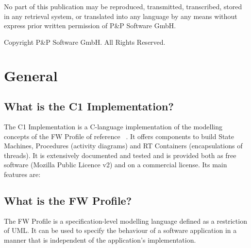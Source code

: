 \documentclass[a4paper,10pt]{article}
\let\stdsection\section
\renewcommand\section{\newpage\stdsection}
\begin{document}
\newpage
\vspace*{\fill}
\begin{center}
No part of this publication may be reproduced, transmitted, transcribed, stored in any retrieval system, or translated into any language
by any means without express prior written permission of P\&P Software GmbH.
\end{center}

\begin{center}
Copyright  P\&P Software GmbH. All Rights Reserved. 
\end{center}
\vspace*{\fill}

\newpage

\tableofcontents
\newpage

\setlength{\parskip}{3mm}						%


\section{General}
\subsection{What is the C1 Implementation?}
The C1 Implementation is a C-language implementation of the modelling concepts of the FW Profile of reference ~\cite{ref:fwprofile}. It offers components to build State Machines, Procedures (activity diagrams) and RT Containers (encapsulations of threads). It is extensively documented and tested and is provided both as free software (Mozilla Public Licence v2) and on a commercial license. Its main features are:



\subsection{What is the FW Profile?}\label{faq:FW_Profile}
The FW Profile is a specification-level modelling language defined as a restriction of UML. It can be used to specify the behaviour of a software application in a manner that is independent of the application's implementation.
\end{document}
